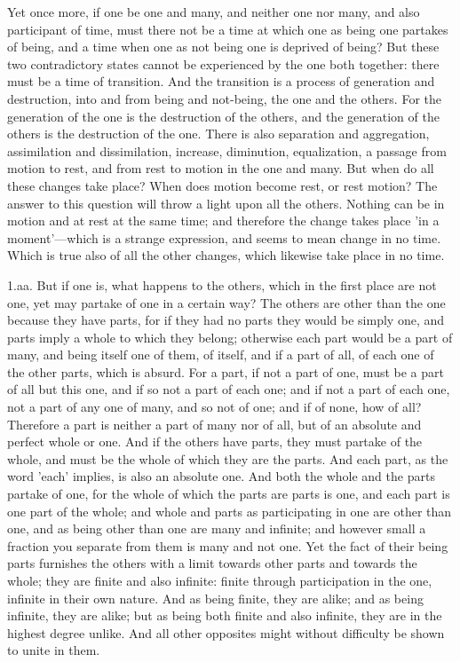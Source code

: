 \documentclass[11pt,letter]{article}
\begin{document}
\par  Yet once more, if one be one and many, and neither one nor many, and also participant of time, must there not be a time at which one as being one partakes of being, and a time when one as not being one is deprived of being? But these two contradictory states cannot be experienced by the one both together: there must be a time of transition. And the transition is a process of generation and destruction, into and from being and not-being, the one and the others. For the generation of the one is the destruction of the others, and the generation of the others is the destruction of the one. There is also separation and aggregation, assimilation and dissimilation, increase, diminution, equalization, a passage from motion to rest, and from rest to motion in the one and many. But when do all these changes take place? When does motion become rest, or rest motion? The answer to this question will throw a light upon all the others. Nothing can be in motion and at rest at the same time; and therefore the change takes place 'in a moment'—which is a strange expression, and seems to mean change in no time. Which is true also of all the other changes, which likewise take place in no time.

\par  1.aa. But if one is, what happens to the others, which in the first place are not one, yet may partake of one in a certain way? The others are other than the one because they have parts, for if they had no parts they would be simply one, and parts imply a whole to which they belong; otherwise each part would be a part of many, and being itself one of them, of itself, and if a part of all, of each one of the other parts, which is absurd. For a part, if not a part of one, must be a part of all but this one, and if so not a part of each one; and if not a part of each one, not a part of any one of many, and so not of one; and if of none, how of all? Therefore a part is neither a part of many nor of all, but of an absolute and perfect whole or one. And if the others have parts, they must partake of the whole, and must be the whole of which they are the parts. And each part, as the word 'each' implies, is also an absolute one. And both the whole and the parts partake of one, for the whole of which the parts are parts is one, and each part is one part of the whole; and whole and parts as participating in one are other than one, and as being other than one are many and infinite; and however small a fraction you separate from them is many and not one. Yet the fact of their being parts furnishes the others with a limit towards other parts and towards the whole; they are finite and also infinite: finite through participation in the one, infinite in their own nature. And as being finite, they are alike; and as being infinite, they are alike; but as being both finite and also infinite, they are in the highest degree unlike. And all other opposites might without difficulty be shown to unite in them.
\end{document}
